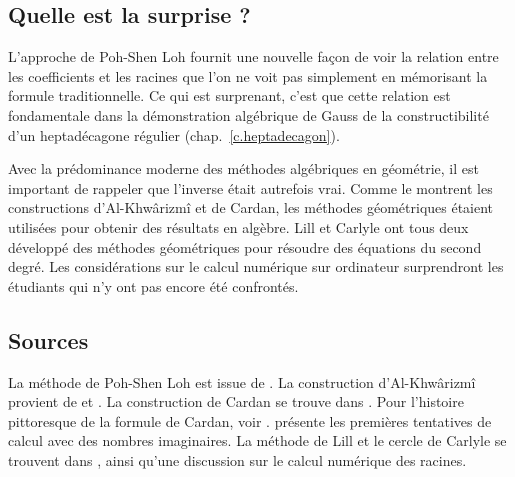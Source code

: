 \subsection*{Quelle est la surprise ?}

L'approche de Poh-Shen Loh fournit une nouvelle façon de voir la relation entre les coefficients et les racines que l'on ne voit pas simplement en mémorisant la formule traditionnelle. Ce qui est surprenant, c'est que cette relation est fondamentale dans la démonstration algébrique de Gauss de la constructibilité d'un heptadécagone régulier (chap.~\ref{c.heptadecagon}).

Avec la prédominance moderne des méthodes algébriques en géométrie, il est important de rappeler que l'inverse était autrefois vrai. Comme le montrent les constructions d'Al-Khwârizmî et de Cardan, les méthodes géométriques étaient utilisées pour obtenir des résultats en algèbre. Lill et Carlyle ont tous deux développé des méthodes géométriques pour résoudre des équations du second degré. Les considérations sur le calcul numérique sur ordinateur surprendront les étudiants qui n'y ont pas encore été confrontés.

\subsection*{Sources}
La méthode de Poh-Shen Loh est issue de \cite{loh1,loh2}. La construction d'Al-Khwârizmî provient de \cite[chapitre~1]{jorg} et \cite{mastin}. La construction de Cardan se trouve dans \cite[chap.~1]{jorg}. Pour l'histoire pittoresque  de la formule de Cardan, voir \cite{wiki:cardano}. \cite[chapitre~2]{jorg} présente les premières tentatives de calcul avec des nombres imaginaires. La méthode de Lill et le cercle de Carlyle se trouvent dans \cite{wiki:quadratic}, ainsi qu'une discussion sur le calcul numérique des racines.
